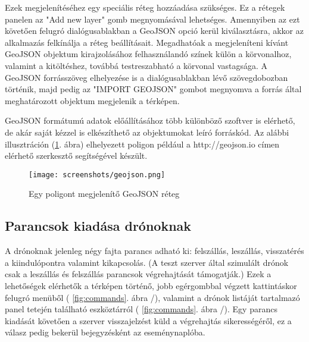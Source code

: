 Ezek megjelenítéséhez egy speciális réteg hozzáadása szükséges. Ez a rétegek
panelen az "Add new layer" gomb megnyomásával lehetséges. Amennyiben az ezt
követően felugró dialógusablakban a GeoJSON opció kerül kiválasztásra, akkor az
alkalmazás felkínálja a réteg beállításait. Megadhatóak a megjeleníteni kívánt
GeoJSON objektum kirajzolásához felhasználandó színek külön a körvonalhoz,
valamint a kitöltéshez, továbbá testreszabható a körvonal vastagsága. A GeoJSON
forrásszöveg elhelyezése is a dialógusablakban lévő szövegdobozban történik,
majd pedig az "IMPORT GEOJSON" gombot megnyomva a forrás által meghatározott
objektum megjelenik a térképen.

GeoJSON formátumú adatok előállításához több különböző szoftver is elérhető, de
akár saját kézzel is elkészíthető az objektumokat leíró forráskód. Az alábbi
illusztráción (\ref{fig:geojson}. ábra) elhelyezett poligon például a
http://geojson.io címen elérhető szerkesztő segítségével készült.

\begin{figure}[H]
  \texttt{[image: screenshots/geojson.png]}
  \caption{Egy poligont megjelenítő GeoJSON réteg}
  \label{fig:geojson}
\end{figure}

\subsection{Parancsok kiadása drónoknak}

A drónoknak jelenleg négy fajta parancs adható ki: felszállás, leszállás,
visszatérés a kiindulópontra valamint kikapcsolás. (A teszt szerver által
szimulált drónok csak a leszállás és felszállás parancsok végrehajtását
támogatják.) Ezek a lehetőségek elérhetők a térképen történő, jobb egérgombbal
végzett kattintáskor felugró menüből ( \ref{fig:commands}. ábra /),
valamint a drónok listáját tartalmazó panel tetején található eszköztárról
( \ref{fig:commands}. ábra /). Egy parancs kiadását követően a
szerver visszajelzést küld a végrehajtás sikerességéről, ez a válasz pedig
bekerül bejegyzésként az eseménynaplóba.

